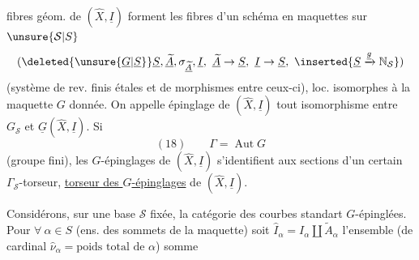 fibres géom. de $(\widehat X,\underline I)$ forment les fibres d'un schéma en maquettes  sur $\unsure{\mathcal S|S}$
\[
(\deleted{\unsure{\underline G|\underline S}}\underline S,\underline{\widetilde A},\sigma_{\underline{\widetilde A}},\underline I,\ \underline{\widetilde A}\to\underline S,\ \underline I\to\underline S,\ \inserted{\underline S\xrightarrow{\underline g}\mathbb N_{\mathcal S}})
\]
(système de rev. finis étales  et de morphismes entre ceux-ci), loc. isomorphes à la maquette $G$ donnée.  On appelle épinglage de $(\widehat X,\underline I)$ tout isomorphisme entre $G_{\mathcal S}$ et $\underline G(\widehat X,\underline I)$. Si \deleted{$\unsure{\Gamma}$}
\[
(18)\qquad\Gamma=\operatorname{Aut}G
\]
(groupe fini), les $G$-épinglages de $(\widehat X,\underline I)$ s'identifient aux sections d'un certain $\Gamma_{\mathcal S}$-torseur,  \uline{torseur des $G$-épinglages} de $(\widehat X,\underline I)$.

Considérons, sur une base $\mathcal S$ fixée, la catégorie  des courbes standart $G$-épinglées. Pour $\forall\ \alpha\in S$ (ens. des sommets de la maquette) soit $\widehat I_\alpha=I_\alpha\amalg\widetilde A_\alpha$ l'ensemble (de cardinal $\widehat\nu_\alpha=\text{poids total de }\alpha$) somme
